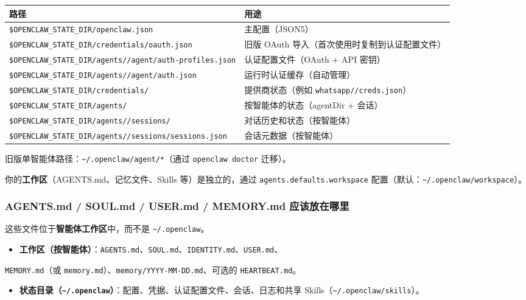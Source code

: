 \begin{table}[h]
\centering
\small
\begin{tabular}{|l|l|}
\hline
路径 & 用途 \\
\hline
\texttt{\$OPENCLAW\_STATE\_DIR/openclaw.json} & 主配置（JSON5） \\
\hline
\texttt{\$OPENCLAW\_STATE\_DIR/credentials/oauth.json} & 旧版 OAuth 导入（首次使用时复制到认证配置文件） \\
\hline
\texttt{\$OPENCLAW\_STATE\_DIR/agents//agent/auth-profiles.json} & 认证配置文件（OAuth + API 密钥） \\
\hline
\texttt{\$OPENCLAW\_STATE\_DIR/agents//agent/auth.json} & 运行时认证缓存（自动管理） \\
\hline
\texttt{\$OPENCLAW\_STATE\_DIR/credentials/} & 提供商状态（例如 \texttt{whatsapp//creds.json}） \\
\hline
\texttt{\$OPENCLAW\_STATE\_DIR/agents/} & 按智能体的状态（agentDir + 会话） \\
\hline
\texttt{\$OPENCLAW\_STATE\_DIR/agents//sessions/} & 对话历史和状态（按智能体） \\
\hline
\texttt{\$OPENCLAW\_STATE\_DIR/agents//sessions/sessions.json} & 会话元数据（按智能体） \\
\hline
\end{tabular}
\end{table}



旧版单智能体路径：\texttt{\textasciitilde{}/.openclaw/agent/*}（通过 \texttt{openclaw doctor} 迁移）。

你的\textbf{工作区}（AGENTS.md、记忆文件、Skills 等）是独立的，通过 \texttt{agents.defaults.workspace} 配置（默认：\texttt{\textasciitilde{}/.openclaw/workspace}）。

\subsubsection{AGENTS.md / SOUL.md / USER.md / MEMORY.md 应该放在哪里}


这些文件位于\textbf{智能体工作区}中，而不是 \texttt{\textasciitilde{}/.openclaw}。

\begin{itemize}
  \item \textbf{工作区（按智能体）}：\texttt{AGENTS.md}、\texttt{SOUL.md}、\texttt{IDENTITY.md}、\texttt{USER.md}、
\end{itemize}

\texttt{MEMORY.md}（或 \texttt{memory.md}）、\texttt{memory/YYYY-MM-DD.md}、可选的 \texttt{HEARTBEAT.md}。
\begin{itemize}
  \item \textbf{状态目录（\texttt{\textasciitilde{}/.openclaw}）}：配置、凭据、认证配置文件、会话、日志和共享 Skills（\texttt{\textasciitilde{}/.openclaw/skills}）。
\end{itemize}


